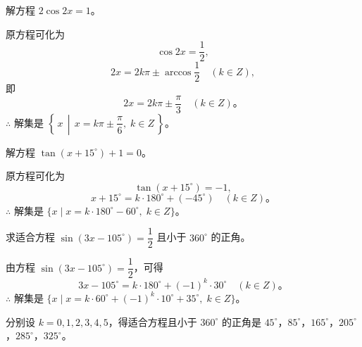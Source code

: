 \liti 解方程 $2\cos2x = 1$。

\jie 原方程可化为
$$\cos2x = \dfrac{1}{2},$$
$$2x = 2k\pi \pm \arccos \dfrac{1}{2} \quad (k \in Z),$$
即
$$2x = 2k\pi \pm \dfrac{\pi}{3} \quad (k \in Z) \text{。}$$
$\therefore$ 解集是 $\left\{\, x \,\middle|\, x = k\pi \pm \dfrac{\pi}{6}, \; k \in Z \,\right\}$。


\liti 解方程 $\tan(x + 15^\circ) + 1 = 0$。

\jie 原方程可化为
$$\tan(x + 15^\circ) = -1,$$
$$x + 15^\circ = k \cdot 180^\circ + (-45^\circ) \quad (k \in Z) \text{。}$$
$\therefore$ 解集是 $\{ x \mid x = k \cdot 180^\circ - 60^\circ, \; k \in Z \}$。


\liti 求适合方程 $\sin(3x - 105^\circ) = \dfrac{1}{2}$ 且小于 $360^\circ$ 的正角。

\jie 由方程 $\sin(3x - 105^\circ) = \dfrac{1}{2}$，可得
$$3x - 105^\circ = k \cdot 180^\circ + (-1)^k \cdot 30^\circ \quad (k \in Z) \text{。}$$
$\therefore$ 解集是 $\{ x \mid x = k \cdot 60^\circ + (-1)^k \cdot 10^\circ + 35^\circ, \; k \in Z \}$。

分别设 $k = 0, 1, 2, 3, 4, 5$，得适合方程且小于 $360^\circ$ 的正角是
$45^\circ$，$85^\circ$，$165^\circ$，$205^\circ$，$285^\circ$，$325^\circ$。


